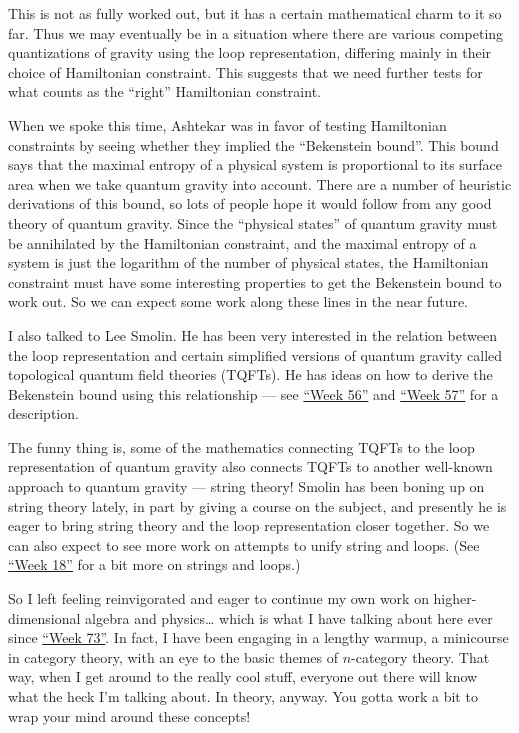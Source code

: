 \documentclass{article}
\begin{document}
This is not as fully worked out, but it has a certain mathematical charm
to it so far. Thus we may eventually be in a situation where there are
various competing quantizations of gravity using the loop
representation, differing mainly in their choice of Hamiltonian
constraint. This suggests that we need further tests for what counts as
the ``right'' Hamiltonian constraint.

When we spoke this time, Ashtekar was in favor of testing Hamiltonian
constraints by seeing whether they implied the ``Bekenstein bound''.
This bound says that the maximal entropy of a physical system is
proportional to its surface area when we take quantum gravity into
account. There are a number of heuristic derivations of this bound, so
lots of people hope it would follow from any good theory of quantum
gravity. Since the ``physical states'' of quantum gravity must be
annihilated by the Hamiltonian constraint, and the maximal entropy of a
system is just the logarithm of the number of physical states, the
Hamiltonian constraint must have some interesting properties to get the
Bekenstein bound to work out. So we can expect some work along these
lines in the near future.

I also talked to Lee Smolin. He has been very interested in the relation
between the loop representation and certain simplified versions of
quantum gravity called topological quantum field theories (TQFTs). He
has ideas on how to derive the Bekenstein bound using this relationship
--- see \protect\hyperlink{week56}{``Week 56''} and
\protect\hyperlink{week57}{``Week 57''} for a description.

The funny thing is, some of the mathematics connecting TQFTs to the loop
representation of quantum gravity also connects TQFTs to another
well-known approach to quantum gravity --- string theory! Smolin has
been boning up on string theory lately, in part by giving a course on
the subject, and presently he is eager to bring string theory and the
loop representation closer together. So we can also expect to see more
work on attempts to unify string and loops. (See
\protect\hyperlink{week18}{``Week 18''} for a bit more on strings and
loops.)

So I left feeling reinvigorated and eager to continue my own work on
higher-dimensional algebra and physics\ldots{} which is what I have
talking about here ever since \protect\hyperlink{week73}{``Week 73''}.
In fact, I have been engaging in a lengthy warmup, a minicourse in
category theory, with an eye to the basic themes of \(n\)-category
theory. That way, when I get around to the really cool stuff, everyone
out there will know what the heck I'm talking about. In theory, anyway.
You gotta work a bit to wrap your mind around these concepts!
\end{document}
